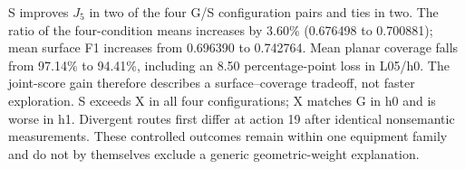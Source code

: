 S improves $J_5$ in two of the four G/S configuration pairs and ties in two. The ratio of the four-condition means increases by 3.60\% (0.676498 to 0.700881); mean surface F1 increases from 0.696390 to 0.742764. Mean planar coverage falls from 97.14\% to 94.41\%, including an 8.50 percentage-point loss in L05/h0. The joint-score gain therefore describes a surface--coverage tradeoff, not faster exploration. S exceeds X in all four configurations; X matches G in h0 and is worse in h1. Divergent routes first differ at action 19 after identical nonsemantic measurements. These controlled outcomes remain within one equipment family and do not by themselves exclude a generic geometric-weight explanation.
